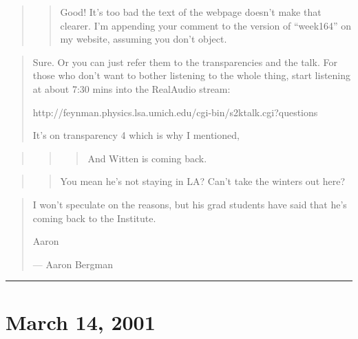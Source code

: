 \documentclass{article}
\begin{document}
\begin{quote}
\begin{quote}
Good! It's too bad the text of the webpage doesn't make that clearer.
I'm appending your comment to the version of ``week164'' on my website,
assuming you don't object.
\end{quote}
\end{quote}

\begin{quote}
Sure. Or you can just refer them to the transparencies and the talk. For
those who don't want to bother listening to the whole thing, start
listening at about 7:30 mins into the RealAudio stream:

http://feynman.physics.lsa.umich.edu/cgi-bin/s2ktalk.cgi?questions

It's on transparency 4 which is why I mentioned,
\end{quote}

\begin{quote}
\begin{quote}
\begin{quote}
And Witten is coming back.
\end{quote}
\end{quote}
\end{quote}

\begin{quote}
\begin{quote}
You mean he's not staying in LA? Can't take the winters out here?
\end{quote}
\end{quote}

\begin{quote}
I won't speculate on the reasons, but his grad students have said that
he's coming back to the Institute.

Aaron

--- Aaron Bergman
\end{quote}

\begin{center}\rule{0.5\linewidth}{0.5pt}\end{center}



\hypertarget{week165}{%
\section{March 14, 2001}\label{week165}}
\end{document}
